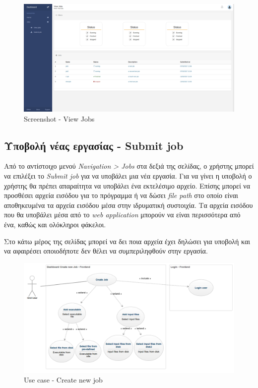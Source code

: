 \begin{figure}[bp!]
\caption{Screenshot - View Jobs}
\includegraphics[width=16cm]{../images/view-jobs-screenshot.png}
\centering
\end{figure}
\clearpage


\subsection{Υποβολή νέας εργασίας - Submit job}

Από το αντίστοιχο μενού \textit{Navigation > Jobs} στα δεξιά της σελίδας, ο χρήστης μπορεί να επιλέξει το \textit{Submit job} για να υποβάλει μια νέα εργασία.  
\newline
Για να γίνει η υποβολή ο χρήστης θα πρέπει απαραίτητα να υποβάλει ένα εκτελέσιμο αρχείο. 
Επίσης μπορεί να προσθέσει αρχεία εισόδου για το πρόγραμμα ή να δώσει  \textit{file path} στο οποίο είναι αποθηκευμένα τα αρχεία εισόδου μέσα στην ιδρυματική συστοιχία. Τα αρχεία εισόδου που θα υποβάλει μέσα από το \textit{web application} μπορούν να είναι περισσότερα από ένα, καθώς και ολόκληροι φάκελοι. 
\newline

Στο κάτω μέρος της σελίδας μπορεί να δει ποια αρχεία έχει δηλώσει για υποβολή και να αφαιρέσει οποιοδήποτε δεν θέλει να συμπεριληφθούν στην εργασία.
\newline

\begin{figure}[bp!]
\caption{Use case - Create new job}
\includegraphics[width=16cm]{../images/create-job-case.png}
\centering
\end{figure}
\clearpage

